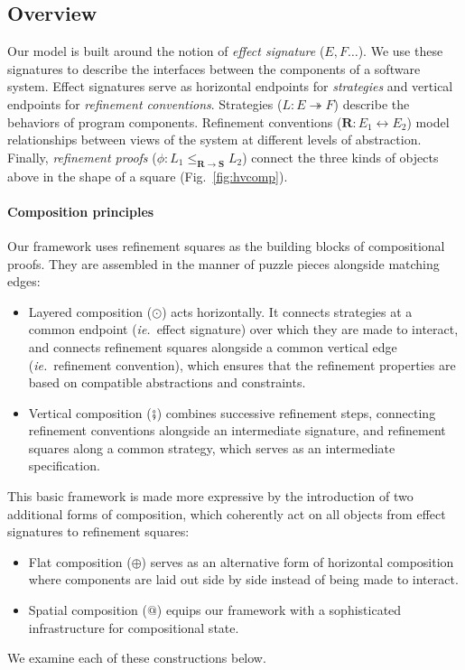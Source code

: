 \documentclass[acmsmall,screen,review,nonacm]{acmart}
\begin{document}
\subsection{Overview} %


Our model is built around the notion of \emph{effect signature} ($E, F\ldots$).
We use these signatures to describe the
interfaces between the components of a software system.
Effect signatures serve
as horizontal endpoints for \emph{strategies}
and vertical endpoints for \emph{refinement conventions}.
Strategies
($L : E \twoheadrightarrow F$)
describe the behaviors of program components.
Refinement conventions
($\mathbf{R} : E_1 \leftrightarrow E_2$)
model relationships between
views of the system at different levels of abstraction.
Finally,
\emph{refinement proofs}
($\phi : L_1 \le_{\mathbf{R} \rightarrow \mathbf{S}} L_2$)
connect the three kinds of objects above
in the shape of a square (Fig.~\ref{fig:hvcomp}).


\paragraph{Composition principles} %

Our framework uses
refinement squares as the building blocks of compositional proofs.
They are assembled in the manner of puzzle pieces
alongside matching edges:
\begin{itemize}
\item Layered composition ($\odot$) acts horizontally.
  It connects strategies at a common endpoint (\emph{ie.}~effect signature)
  over which they are made to interact,
  and connects refinement squares alongside a common
  vertical edge (\emph{ie.}~refinement convention),
  which ensures that the refinement properties
  are based on compatible abstractions and constraints.
\item Vertical composition ($\fatsemi$)
  combines successive refinement steps,
  connecting refinement conventions alongside an intermediate signature,
  and refinement squares along a common strategy,
  which serves as an intermediate specification.
\end{itemize}
This basic framework is made more expressive
by the introduction of two additional forms of composition,
which coherently act on all objects from effect signatures to refinement squares:
\begin{itemize}
\item Flat composition ($\oplus$)
  serves as an alternative form of horizontal composition
  where components are laid out side by side
  instead of being made to interact.
\item Spatial composition ($\mathbin@$)
  equips our framework with a sophisticated infrastructure
  for compositional state.
\end{itemize}
We examine each of these constructions below.
\end{document}
